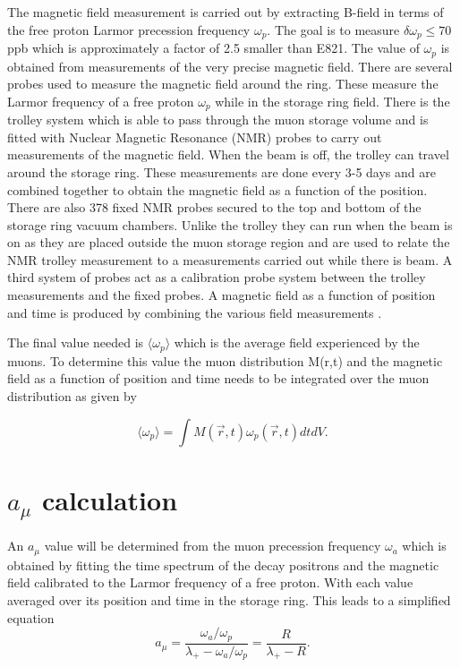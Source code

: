 The magnetic field measurement is carried out by extracting B-field in terms of the free proton Larmor precession frequency $\omega{_p}$. The goal is to measure $\delta\omega_{p} \leq {70}$ppb which is approximately a factor of 2.5 smaller than E821. The value of $\omega_{p}$ is obtained from measurements of the very precise magnetic field. There are several probes used to measure the magnetic field around the ring. These measure the Larmor frequency of a free proton $\omega_{p}$ while in the storage ring field. There is the trolley system which is able to pass through the muon storage volume and is fitted with Nuclear Magnetic Resonance (NMR) probes to carry out measurements of the magnetic field. When the beam is off, the trolley can travel around the storage ring. These measurements are done every 3-5 days and are combined together to obtain the magnetic field as a function of the position.
There are also 378 fixed NMR probes secured to the top and bottom of the storage ring vacuum chambers. Unlike the trolley they can run when the beam is on as they are placed outside the muon storage region and are used to relate the NMR trolley measurement to a measurements carried out while there is beam. A third system of probes act as a calibration probe system between the trolley measurements and the fixed probes. A magnetic field as a function of position and time is produced by combining the various field measurements \cite{Chap2Ref1}.

The final value needed is $\big \langle \omega_{p} \big \rangle$ which is the average field experienced by the muons. To determine this value the muon distribution M(r,t) and the magnetic field as a function of position and time needs to be integrated over the muon distribution as given by

\begin{equation}
\big \langle {\omega_{p}} \big \rangle = \int M(\vec{r},t) {\omega_{p}}(\vec{r},t) dt dV. 
\end{equation}

\section{$a_{\mu}$ calculation}

An $a_{\mu}$ value will be determined from the muon precession frequency $\omega_{a}$ which is obtained by fitting the time spectrum of the decay positrons and the magnetic field calibrated to the Larmor frequency of a free proton. With each value averaged over its position and time in the storage ring.
\noindent
This leads to a simplified equation
\begin{equation}
a_{\mu} = \frac {\omega_{a}/\omega_{p}}{\lambda_{+}-\omega_{a}/\omega_{p}} = \frac {R}{\lambda_{+} -R}.
\end{equation}
 

